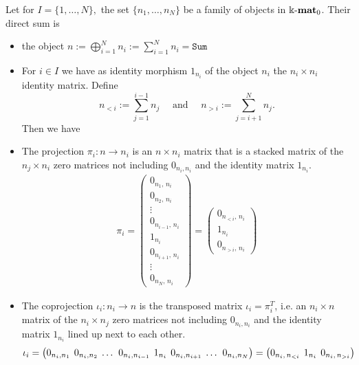 \begin{example}\label{ex:kmat_additive}
Let for $I = \{1,\dots,N\},$ the set $\{n_{1},\dots,n_{N}\}$ be a family of objects in $\Bbbk\textnormal{-}\mathbf{mat}_{0}$. Their direct sum is
\begin{itemize}
\item the object $n := \bigoplus_{i=1}^{N} n_{i} := \sum_{i=1}^{N} n_{i} = \mathtt{Sum}$
\item For $i \in I$ we have as identity morphism $1_{n_{i}}$ of the object $n_{i}$ the $n_{i} \times n_{i}$ identity matrix.
Define
\[
n_{<i} := \sum_{j=1}^{i-1} n_{j}\quad \text{ and }\quad n_{>i} := \sum_{j=i+1}^{N} n_{j}.
\]
Then we have
\item The projection $\pi_{i} : n \rightarrow n_{i}$ is an $n \times n_{i}$ matrix that is a stacked matrix of the $n_{j}\times n_{i}$
zero matrices not including $0_{n_{i},n_{i}}$ and the identity matrix $1_{n_{i}}$.
\begin{align}
\pi_{i} = \label{eq:projection_direct_sum_matrix}
\begin{pmatrix}
0_{n_{1},\,n_{i}} \\
0_{n_{2},\,n_{i}} \\
\vdots \\
0_{n_{i-1},\,n_{i}} \\
1_{n_{i}} \\
0_{n_{i+1},\,n_{i}} \\
\vdots \\
0_{n_{N},\,n_{i}}
\end{pmatrix}
=
\begin{pmatrix}
0_{n_{<i},\,n_{i}} \\
1_{n_{i}} \\
0_{n_{>i},\,n_{i}}
\end{pmatrix}
\end{align}
\item The coprojection $\iota_{i} : n_{i} \rightarrow n$ is the transposed matrix $\iota_{i} = \pi_{i}^{T}$, i.e. an $n_{i} \times n$ matrix of
the $n_{i} \times n_{j}$ zero matrices not including $0_{n_{i},n_{i}}$ and the identity matrix $1_{n_{i}}$ lined up next to each other.
\begin{align}
\iota_{i} = \label{eq:coprojection_direct_sum_matrix}
\begingroup
\setlength\arraycolsep{2pt}
\begin{pmatrix}
0_{n_{i},n_{1}} & 0_{n_{i},n_{2}} & \dots & 0_{n_{i},n_{i-1}} & 1_{n_{i}} & 0_{n_{i},n_{i+1}} & \dots & 0_{n_{i},n_{N}}
\end{pmatrix}
= \begin{pmatrix}
0_{n_{i},\,n_{<i}} & 1_{n_{i}} & 0_{n_{i},\,n_{>i}}
\end{pmatrix} \endgroup
\end{align}


\end{itemize}
\end{example}
